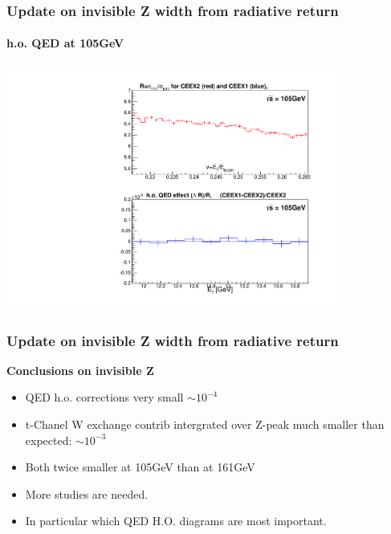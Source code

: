 \documentclass{beamer}
\begin{document}
\begin{frame}[fragile]
\frametitle{\bf Update on invisible Z width from radiative return}
\framesubtitle{\bf\large h.o. QED at 105GeV}

\includegraphics[width=110mm,height=80mm]{./cCeex21rat_E105.pdf}
\end{frame}


\begin{frame}[fragile]
\frametitle{\bf Update on invisible Z width from radiative return}

{\bf Conclusions on invisible Z}
\begin{itemize}
\item 
 QED h.o. corrections very small $\sim 10^{-4}$
\item
 t-Chanel W exchange contrib intergrated over Z-peak
 much smaller than expected: $\sim 10^{-3}$
\item
 Both twice smaller at 105GeV than at 161GeV
\item
 More studies are needed.
\item
 In particular which QED H.O. diagrams are most important.
\end{itemize}
\end{frame}
\end{document}
